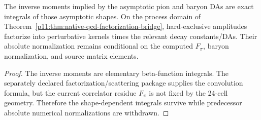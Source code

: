 \documentclass[12pt,a4paper]{article}
\begin{document}
\begin{corollary}
\label{p11:cor:hard-exclusive-da-moments-and-kernels}

The inverse moments implied by the asymptotic pion and baryon DAs are exact
integrals of those asymptotic shapes.  On the process domain of
Theorem~\ref{p11:thm:native-qcd-factorization-bridge}, hard-exclusive amplitudes
factorize into perturbative kernels times the relevant decay constants/DAs.
Their absolute normalization remains conditional on the computed \(F_\pi\),
baryon normalization, and source matrix elements.
\label{p11:eq:pion-da-inverse-moments-closed}
\label{p11:eq:pion-transition-form-factor-asymptotic-bh}
\label{p11:eq:pion-em-form-factor-hard-asymptotic-bh}
\label{p11:eq:baryon-da-inverse-moments-closed}
\end{corollary}
\begin{proof}

The inverse moments are elementary beta-function integrals.  The separately
declared factorization/scattering package supplies the convolution formula, but
the current correlator residue \(F_\pi\) is not fixed by the 24-cell geometry.
Therefore the shape-dependent integrals survive while predecessor absolute
numerical normalizations are withdrawn.
\end{proof}
\end{document}

